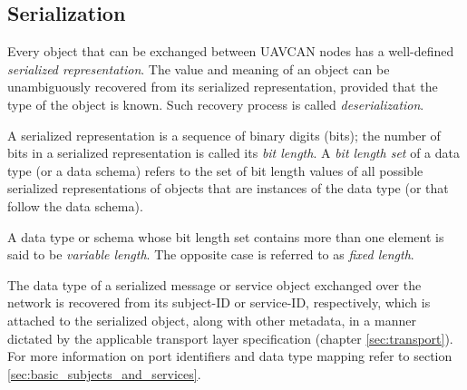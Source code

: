 \subsection{Serialization}

Every object that can be exchanged between UAVCAN nodes has a well-defined \emph{serialized representation}.
The value and meaning of an object can be unambiguously recovered from its serialized representation,
provided that the type of the object is known.
Such recovery process is called \emph{deserialization}.

\label{sec:dsdl_bit_length_set}
A serialized representation is a sequence of binary digits (bits);
the number of bits in a serialized representation is called its \emph{bit length}.
A \emph{bit length set} of a data type (or a data schema) refers to the set of bit length values of all possible
serialized representations of objects that are instances of the data type (or that follow the data schema).

A data type or schema whose bit length set contains more than one element is said to be \emph{variable length}.
The opposite case is referred to as \emph{fixed length}.

The data type of a serialized message or service object exchanged over the network
is recovered from its subject-ID or service-ID, respectively,
which is attached to the serialized object, along with other metadata, in a manner dictated by the applicable
transport layer specification (chapter \ref{sec:transport}).
For more information on port identifiers and data type mapping refer to section \ref{sec:basic_subjects_and_services}.
